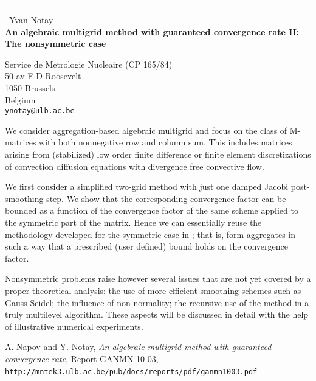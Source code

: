 \documentclass{report}
\begin{document}
\begin{center}
\rule{6in}{1pt} \
{\large Yvan Notay \\
{\bf An algebraic multigrid method with guaranteed convergence rate II: The nonsymmetric case}}

Service de Metrologie Nucleaire (CP 165/84) \\ 50 av F D Roosevelt \\ 1050 Brussels \\ Belgium
\\
{\tt ynotay@ulb.ac.be}\end{center}

We consider aggregation-based algebraic multigrid
and focus on the class of
M-matrices with both nonnegative row and column sum. This includes matrices
arising from (stabilized) low order finite difference or finite element
discretizations of convection diffusion equations with divergence free
convective flow.

We first consider a simplified two-grid method with just one damped Jacobi
post-smoothing step. We show that the corresponding convergence factor
can be bounded as a function of the convergence factor of the same scheme
applied to the symmetric part of the matrix.
Hence we can essentially reuse the methodology developed for the symmetric
case in \cite{1}; that is, form aggregates
in such a way that a prescribed (user defined) bound holds on
the convergence factor.

Nonsymmetric problems raise however several issues that are not yet
covered by a proper
theoretical analysis: the use of more efficient smoothing schemes such as Gauss-Seidel;
the influence of non-normality;
the recursive use of the method in a truly multilevel algorithm.
These aspects will be discussed in detail with the help of illustrative
numerical experiments.

\begin{thebibliography}{9}

 A. Napov and Y. Notay, {\em An algebraic multigrid method
with guaranteed convergence rate},
Report GANMN 10-03, \verb+http://mntek3.ulb.ac.be/pub/docs/reports/pdf/ganmn1003.pdf+\,

\end{thebibliography}
\end{document}
